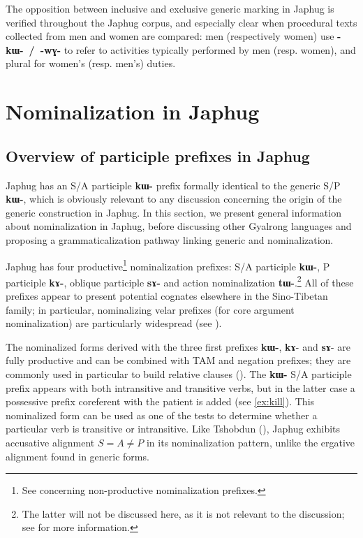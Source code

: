 \documentclass[oneside,a4paper,11pt]{article}
\newcommand{\ipa}[1]{\textbf{\phon\mbox{#1}}} %
\begin{document}
The opposition between inclusive and exclusive generic marking in Japhug is verified throughout the Japhug corpus, and especially clear when procedural texts collected from men and women are compared: men (respectively women) use  \ipa{-kɯ- / -wɣ-} to refer to activities typically performed by men (resp. women), and plural for women's (resp. men's) duties.

 \section{Nominalization in Japhug} \label{sec:nmlz}
 \subsection{Overview of participle prefixes in Japhug}
Japhug has an S/A participle \ipa{kɯ-} prefix formally identical to the generic S/P \ipa{kɯ-}, which is obviously relevant to any discussion concerning the origin of the generic construction in Japhug. In this section, we present general information about nominalization in Japhug, before discussing other Gyalrong languages and proposing a grammaticalization pathway linking generic and nominalization. 

Japhug has four productive\footnote{See \citet[4-6]{jacques14antipassive} concerning non-productive nominalization prefixes.} nominalization prefixes: S/A participle \ipa{kɯ-},   P participle \ipa{kɤ-},   oblique participle \ipa{sɤ-}  and   action nominalization \ipa{tɯ-}.\footnote{The latter will not be discussed here, as it is not relevant to the discussion; see \citet[6-9]{jacques14antipassive}  for more information.}   All of these prefixes appear to present potential cognates elsewhere in the Sino-Tibetan family; in particular, nominalizing velar prefixes (for core argument nominalization) are particularly widespread (see \citealt{konnerth09nmlz}). 

 The nominalized forms derived with the three first prefixes \ipa{kɯ-}, \ipa{kɤ}- and \ipa{sɤ}- are fully productive and can be combined with TAM and negation prefixes; they are commonly used in particular to build relative clauses (\citealt{jacques16relatives}).  The \ipa{kɯ-} S/A participle prefix appears with both intransitive and transitive verbs, but in the latter case a possessive prefix  coreferent with the patient is added (see \ref{ex:kill}). This nominalized form can be used as one of the tests to determine whether a particular verb is transitive or intransitive. Like Tshobdun (\citealt{jackson03caodeng}),  Japhug exhibits accusative alignment $S=A\neq P$ in its nominalization pattern, unlike the ergative alignment found in generic forms. 
\end{document}
